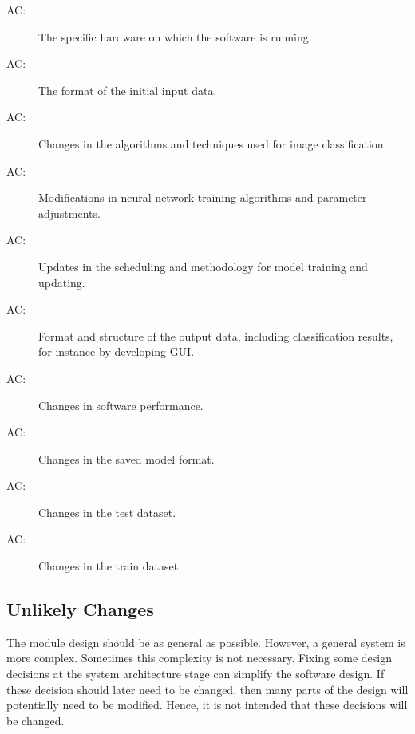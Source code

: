 \documentclass[12pt, titlepage]{article}
\newcounter{acnum}
\newcommand{\actheacnum}{AC\theacnum}
\begin{document}
\begin{description}
\item[ \actheacnum \label{acHardware}:] The specific
  hardware on which the software is running.
\item[ \actheacnum \label{acInput}:] The format of the
  initial input data.
\item[ \actheacnum \label{algo}:] Changes in the 
  algorithms and techniques used for image classification.
\item[ \actheacnum \label{ANNAlgo}:] Modifications in 
  neural network training algorithms and parameter adjustments.
\item[ \actheacnum \label{modelTraining}:] Updates in the 
  scheduling and methodology for model training and updating.
\item[ \actheacnum \label{acOutput}:] Format and structure of the output data, including classification results, 
  for instance by developing GUI.
\item[ \actheacnum \label{acControl}:] Changes in software performance.
\item[ \actheacnum \label{acANN}:] Changes in the saved model format.
\item[ \actheacnum \label{acTestData}:] Changes in the test dataset.
\item[ \actheacnum \label{acTrainData}:] Changes in the train dataset.
\end{description}

\subsection{Unlikely Changes} \label{SecUchange}

The module design should be as general as possible. However, a general system is
more complex. Sometimes this complexity is not necessary. Fixing some design
decisions at the system architecture stage can simplify the software design. If
these decision should later need to be changed, then many parts of the design
will potentially need to be modified. Hence, it is not intended that these
decisions will be changed.
\end{document}
